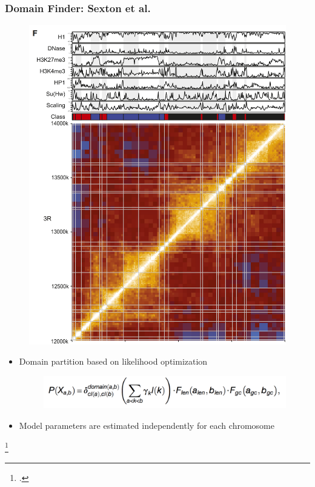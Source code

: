 \documentclass[12pt]{beamer}
\begin{document}
\begin{frame}
\frametitle{Domain Finder: Sexton et al.}

\begin{figure}
\includegraphics[scale=0.3]{dixon.png}
\end{figure}

\begin{itemize}
\item Domain partition based on likelihood optimization
\begin{figure}
\includegraphics[scale=0.8]{dixoneq.png}
\end{figure}
\vspace{0.1cm}
\item Model parameters are estimated independently for each chromosome
\end{itemize}

\footcitetext{sexton2012}

\end{frame}
\end{document}
